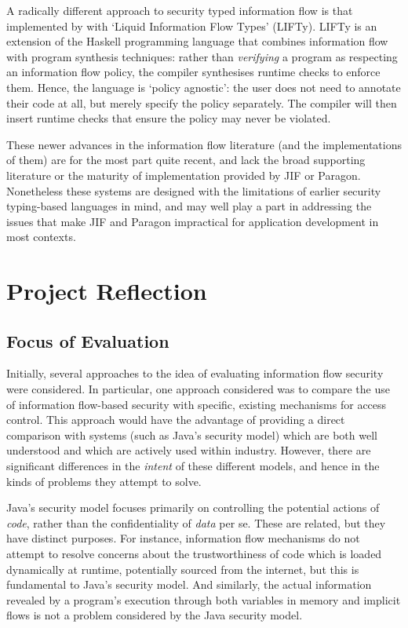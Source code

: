 A radically different approach to security typed information flow is that implemented by \citeauthor{polikarpova2016lifty} \cite{polikarpova2016lifty} with `Liquid Information Flow Types' (LIFTy). LIFTy is an extension of the Haskell programming language that combines information flow with program synthesis techniques: rather than \textit{verifying} a program as respecting an information flow policy, the compiler synthesises runtime checks to enforce them. Hence, the language is `policy agnostic': the user does not need to annotate their code at all, but merely specify the policy separately. The compiler will then insert runtime checks that ensure the policy may never be violated.

These newer advances in the information flow literature (and the implementations of them) are for the most part quite recent, and lack the broad supporting literature or the maturity of implementation provided by JIF or Paragon. Nonetheless these systems are designed with the limitations of earlier security typing-based languages in mind, and may well play a part in addressing the issues that make JIF and Paragon impractical for application development in most contexts.

\section{Project Reflection}


\subsection{Focus of Evaluation}

Initially, several approaches to the idea of evaluating information flow security were considered. In particular, one approach considered was to compare the use of information flow-based security with specific, existing mechanisms for access control. This approach would have the advantage of providing a direct comparison with systems (such as Java's security model) which are both well understood and which are actively used within industry. However, there are significant differences in the \textit{intent} of these different models, and hence in the kinds of problems they attempt to solve.

Java's security model focuses primarily on controlling the potential actions of \textit{code}, rather than the confidentiality of \textit{data} per se. These are related, but they have distinct purposes. For instance, information flow mechanisms do not attempt to resolve concerns about the trustworthiness of code which is loaded dynamically at runtime, potentially sourced from the internet, but this is fundamental to Java's security model. And similarly, the actual information revealed by a program's execution through both variables in memory and implicit flows is not a problem considered by the Java security model.


